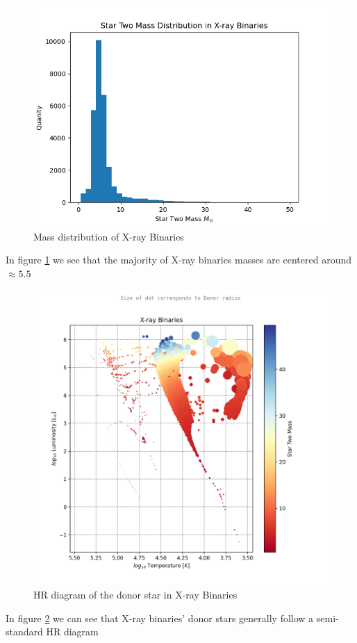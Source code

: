 \documentclass[12pt, letterpaper]{article}
\begin{document}
        \begin{figure}[H]
            \centering
            \includegraphics[scale = .6]{figs/Generated Figs/X-ray Binaries Star Two Mass Distribution.png}
            \caption{Mass distribution of X-ray Binaries}
            \label{XrayBinaryMassDistro}
        \end{figure}
        In figure \ref{XrayBinaryMassDistro} we see that the majority of X-ray binaries masses are centered around $\approx 5.5$

        \begin{figure}[H]
            \centering
            \includegraphics[scale = .6]{figs/Generated Figs/ X-ray Binaries Star Two Mass log10 F star radius T.png}
            \caption{HR diagram of the donor star in X-ray Binaries}
            \label{XrayBinaryHRDiagram}
        \end{figure}
        In figure \ref{XrayBinaryHRDiagram} we can see that X-ray binaries' donor stars generally follow a semi-standard HR diagram 
        
\end{document}
